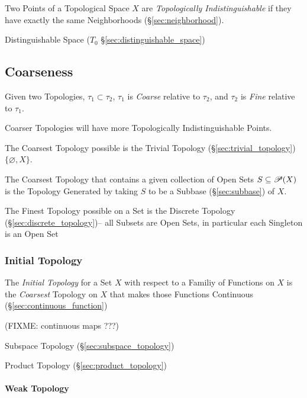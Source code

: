 Two Points of a Topological Space $X$ are \emph{Topologically
  Indistinguishable} if they have exactly the same Neighborhoods
(\S\ref{sec:neighborhood}).

\fist Distinguishable Space ($T_0$ \S\ref{sec:distinguishable_space})



\subsection{Coarseness}\label{sec:coarseness}

Given two Topologies, $\tau_1 \subset \tau_2$, $\tau_1$ is
\emph{Coarse} relative to $\tau_2$, and $\tau_2$ is \emph{Fine}
relative to $\tau_1$.

Coarser Topologies will have more Topologically Indistinguishable
Points.

The Coarsest Topology possible is the Trivial Topology
(\S\ref{sec:trivial_topology}) $\{ \varnothing, X \}$.

The Coarsest Topology that contains a given collection of Open Sets $S
\subseteq \mathscr{P}(X)$ is the Topology Generated by taking $S$ to
be a Subbase (\S\ref{sec:subbase}) of $X$.

The Finest Topology possible on a Set is the Discrete Topology
(\S\ref{sec:discrete_topology})-- all Subsets are Open Sets, in particular each
Singleton is an Open Set



\subsubsection{Initial Topology}\label{sec:initial_topology}

The \emph{Initial Topology} for a Set $X$ with respect to a Familiy of
Functions on $X$ is the \emph{Coarsest} Topology on $X$ that makes those
Functions Continuous (\S\ref{sec:continuous_function})

(FIXME: continuous maps ???)

Subspace Topology (\S\ref{sec:subspace_topology})

Product Topology (\S\ref{sec:product_topology})



\paragraph{Weak Topology}\label{sec:weak_topology}

